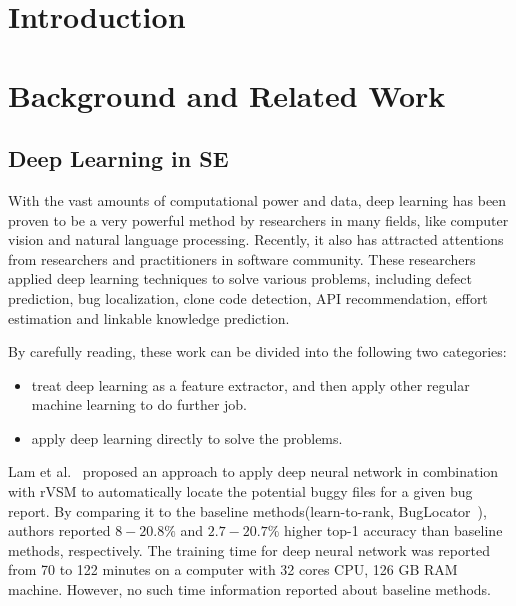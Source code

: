 \documentclass[sigconf,review, anonymous]{acmart}
\theoremstyle{break}
\begin{document}


\maketitle

% 


\section{Introduction}
\section{Background and Related Work}



\subsection{Deep Learning in SE}
With the vast amounts of computational power and data, 
deep learning has been proven to be a very powerful method 
by researchers in many fields\cite{lecun2015deep}, like computer vision and natural language processing\cite{krizhevsky2012imagenet,mikolov2013distributed,sutskever2014sequence}. 
Recently, it also has attracted  attentions from researchers and practitioners in software
 community\cite{wang2016automatically, gu2016deep, xu2016predicting,white2016deep,white2015toward,lam2015combining,choetkiertikul2016deep}.
 These researchers applied  deep learning techniques to solve various problems,
 including defect prediction, bug localization, clone code detection, API recommendation, 
 effort estimation and linkable knowledge prediction.
 
By carefully reading, these work can be divided into the following two categories:
 
\begin{itemize}
\item treat deep learning as a feature extractor, and then apply other regular machine learning to do further job.
\item apply deep learning directly to solve the problems.
\end{itemize}

Lam et al.~\cite{lam2015combining}  proposed an approach to apply deep neural network
 in combination with rVSM to automatically locate the potential buggy files for a given
 bug report. By comparing it to the baseline methods(learn-to-rank\cite{ye2014learning}, 
 BugLocator~\cite{zhou2012should}), authors reported $8-20.8\%$  and $2.7-20.7\%$ 
 higher top-1 accuracy than baseline methods, respectively. The training time for deep neural
 network was reported from 70 to 122 minutes on a computer with 32 cores CPU,
 126 GB RAM machine. However,
 no such time information reported about baseline methods.
 
\end{document}
